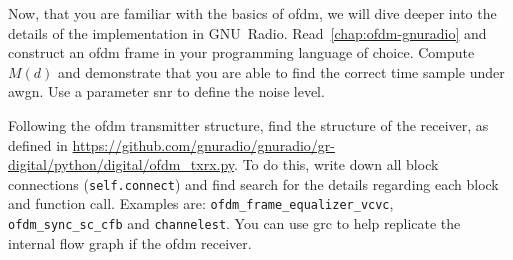 Now, that you are familiar with the basics of \gls{ofdm}, we will dive deeper into the details of the implementation in GNU~Radio. Read~\cref{chap:ofdm-gnuradio} and construct an \gls{ofdm} frame in your programming language of choice. Compute $M(d)$ and demonstrate that you are able to find the correct time sample under \gls{awgn}. Use a parameter \gls{snr} to define the noise level.

Following the \gls{ofdm} transmitter structure, find the structure of the receiver, as defined in \url{https://github.com/gnuradio/gnuradio/gr-digital/python/digital/ofdm_txrx.py}. To do this, write down all block connections (\texttt{self.connect}) and find search for the details regarding each block and function call. Examples are: \texttt{ofdm_frame_equalizer_vcvc}, \texttt{ofdm_sync_sc_cfb} and \texttt{channelest}. You can use \gls{grc} to help replicate the internal flow graph if the \gls{ofdm} receiver.